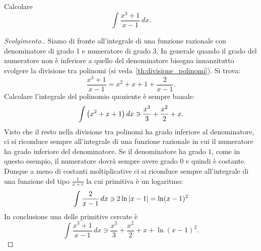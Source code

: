 \begin{example}
  Calcolare 
  \[
  \int \frac{x^3+1}{x-1}\, dx.  
  \]
\end{example}
\begin{proof}[Svolgimento.]
Siamo di fronte all'integrale di una funzione razionale con denominatore di grado 1 e numeratore di grado 3.
In generale quando il grado del numeratore non è inferiore a quello del denominatore bisogna innanzitutto 
svolgere la divisione tra polinomi (si veda~\ref{th:divisione_polinomi}). Si trova: 
\[
\frac{x^3+1}{x-1} = x^2 + x + 1 + \frac{2}{x-1}.
\]
Calcolare l'integrale del polinomio quoziente è sempre banale:
\[
\int {\left( x^2+x+1 \right)}  \, dx \ni \frac{x^3}{3} + \frac{x^2}{2} + x.
\]
Visto che il resto nella divisione tra polinomi ha grado inferiore al denominatore, ci si riconduce 
sempre all'integrale di una funzione razionale in cui il numeratore ha grado inferiore del denominatore.
Se il denominatore ha grado $1$, come in questo esempio, il numeratore dovrà sempre avere grado $0$ e quindi
è costante. 
Dunque a meno di costanti moltiplicative ci si riconduce sempre all'integrale di una funzione del tipo $\frac{1}{x+c}$
la cui primitiva è un logaritmo:
\[
 \int \frac{2}{x-1}\, dx \ni 2 \ln {\left|x-1\right|} = \ln (x-1)^2
\]
In conclusione una delle primitive cercate è 
\[
  \int \frac{x^3+1}{x-1}\, dx \ni \frac{x^3}{3} + \frac{x^2}{2} + x + \ln (x-1)^2.
\]
\end{proof}

